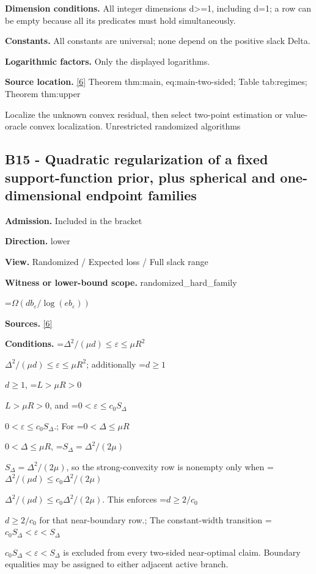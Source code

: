\documentclass[10pt,a4paper]{article}
\newcommand{\AtlasMath}[1]{\par\begingroup\centering\setbox0=\hbox{$\displaystyle #1$}\ifdim\wd0>1.4\linewidth\typeout{ATLAS WIDE FORMULA: \the\wd0}\fi\ifdim\wd0>\linewidth\resizebox{\linewidth}{!}{\box0}\else\box0\fi\par\endgroup}
\newcommand{\AtlasInlineMath}[1]{\begingroup\setbox0=\hbox{$#1$}\ifdim\wd0>.4\linewidth\endgroup\AtlasMath{#1}\else\endgroup$#1$\fi}
\begin{document}
\textbf{Dimension conditions.} All integer dimensions d>=1, including d=1; a row can be empty because all its predicates must hold simultaneously.



\textbf{Constants.} All constants are universal; none depend on the positive slack Delta.



\textbf{Logarithmic factors.} Only the displayed logarithms.



\textbf{Source location.} \href{https://github.com/WU-Wendao/Colombo/blob/main/colombo_sensorium/Complexity_altas/data/sources/colombo/U10/manuscript.pdf}{[6]} Theorem thm:main, eq:main-two-sided; Table tab:regimes; Theorem thm:upper



Localize the unknown convex residual, then select two-point estimation or value-oracle convex localization. Unrestricted randomized algorithms



\subsection{B15 - Quadratic regularization of a fixed support-function prior, plus spherical and one-dimensional endpoint families}


\textbf{Admission.} Included in the bracket



\textbf{Direction.} lower



\textbf{View.} Randomized / Expected loss / Full slack range



\textbf{Witness or lower-bound scope.} randomized\_hard\_family



\AtlasMath{\Omega(db_\varepsilon/\log(eb_\varepsilon))}


\textbf{Sources.} \href{https://github.com/WU-Wendao/Colombo/blob/main/colombo_sensorium/Complexity_altas/data/sources/colombo/U10/manuscript.pdf}{[6]}



\textbf{Conditions.} \AtlasInlineMath{\Delta^2/(\mu d)\le\varepsilon\le\mu R^2}; additionally \AtlasInlineMath{d\ge1}, \AtlasInlineMath{L>\mu R>0}, and \AtlasInlineMath{0<\varepsilon\le c_0S_\Delta}.; For \AtlasInlineMath{0<\Delta\le\mu R}, \AtlasInlineMath{S_\Delta=\Delta^2/(2\mu)}, so the strong-convexity row is nonempty only when \AtlasInlineMath{\Delta^2/(\mu d)\le c_0\Delta^2/(2\mu)}. This enforces \AtlasInlineMath{d\ge2/c_0} for that near-boundary row.; The constant-width transition \AtlasInlineMath{c_0S_\Delta<\varepsilon<S_\Delta} is excluded from every two-sided near-optimal claim. Boundary equalities may be assigned to either adjacent active branch.
\end{document}
